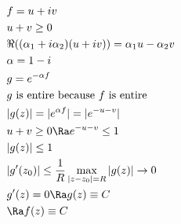\begin{align*}
    &f=u+iv\\
    &u+v\geq0\\
    &\Re((\alpha_1+i\alpha_2)(u+iv))=\alpha_1u-\alpha_2v\\
    &\alpha=1-i\\
    &g=e^{-\alpha f}\\
    &\text{$g$ is entire because $f$ is entire}\\
    &|g(z)|=|e^{\alpha f}|=|e^{-u-v}|\\
    &u+v\geq0\Ra e^{-u-v}\leq 1\\
    &|g(z)|\leq 1\\
    &|g'(z_0)|\leq\frac{1}{R}\max_{|z-z_0|=R}|g(z)|\to0\\
    &g'(z)=0\Ra g(z)\equiv C\\
    &\Ra f(z)\equiv C
\end{align*}

